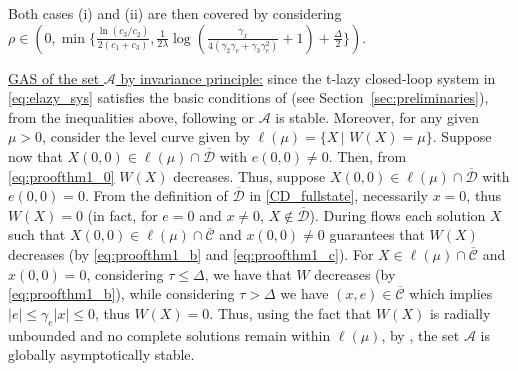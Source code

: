 \documentclass[twocolumn]{autart}
\begin{document}
{
Both cases (i) and (ii) are then covered by considering 
$\rho \in(0, \min\{\frac{\ln(c_3/c_2)}{2(c_1+c_3)},
\frac{1}{2\lambda}
\log(\frac{\gamma_x}{4(\gamma_2\gamma_e + \gamma_3\gamma_e^2)} +1) 
+ \frac{\Delta}{2}\}).$
}



{ \underline{GAS of the set $\mathcal{A}$ by invariance principle:}}
since the t-lazy closed-loop system in \eqref{eq:elazy_sys} 
satisfies the basic conditions of \cite{GoebelCSM09} (see Section~\ref{sec:preliminaries}), 
from the inequalities above, following \cite[Theorem 23]{GoebelCSM09} 
or \cite{SanfeliceTAC07} $\mathcal{A}$ is stable. Moreover, for any given $\mu>0$,
consider the level curve given by $\ell(\mu) = \{X\,|\,\,W(X)=\mu\}$.
Suppose now
that $X(0,0)\in \ell(\mu)\cap\overline{\mathcal{D}}$ with $e(0,0)\neq 0$.
Then, from \eqref{eq:proofthm1_0} $W(X)$ decreases. Thus, 
suppose $X(0,0)\in \ell(\mu)\cap\overline{\mathcal{D}}$ with $e(0,0)=0$.
From the definition of $\overline{\mathcal{D}}$ in \eqref{CD_fullstate},
necessarily $x=0$, thus $W(X)=0$ (in fact, for $e=0$ and $x\neq 0$, 
$X\notin \overline{\mathcal{D}}$).
During flows each solution $X$ such that 
$X(0,0)\in \ell(\mu)\cap\overline{\mathcal{C}}$ and $x(0,0)\neq 0$  
guarantees that $W(X)$ decreases 
(by \eqref{eq:proofthm1_b} and \eqref{eq:proofthm1_c}).  
For $X\in \ell(\mu)\cap \overline{\mathcal{C}}$ and $x(0,0)=0$, 
considering $\tau \leq \Delta$, we have that $W$ decreases 
(by \eqref{eq:proofthm1_b}), while considering $\tau > \Delta$
we have $(x,e)\in \overline{\mathcal{C}}$ which implies 
$|e| \leq \gamma_e|x| \leq 0$, thus $W(X)=0$.
Thus, using the fact that $W(X)$ is radially unbounded and
no complete solutions remain within $\ell(\mu)$, 
by \cite[Theorem 23]{GoebelCSM09}, the set $\mathcal{A}$ is globally asymptotically stable.
\end{document}

